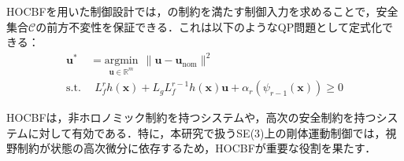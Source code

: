 HOCBFを用いた制御設計では，の制約を満たす制御入力を求めることで，安全集合$\mathcal{C}$の前方不変性を保証できる．これは以下のようなQP問題として定式化できる：
\begin{equation}
\begin{aligned}
    \mathbf{u}^* &= \underset{\mathbf{u} \in \mathbb{R}^m}{\text{argmin}} \:\: \|\mathbf{u} - \mathbf{u}_{\text{nom}}\|^2 \\
\text{s.t.} & \:\:  L_f^r h(\mathbf{x}) + L_g L_f^{r-1} h(\mathbf{x})\mathbf{u} + \alpha_r(\psi_{r-1}(\mathbf{x})) \geq 0
\label{eq:hocbf_qp}
\end{aligned}
\end{equation}

HOCBFは，非ホロノミック制約を持つシステムや，高次の安全制約を持つシステムに対して有効である．特に，本研究で扱うSE(3)上の剛体運動制御では，視野制約が状態の高次微分に依存するため，HOCBFが重要な役割を果たす．
